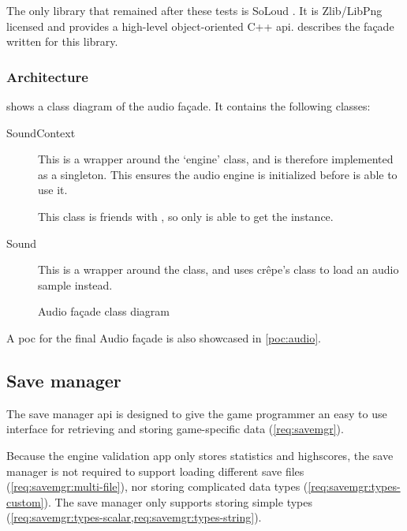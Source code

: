 \documentclass{projdoc}
\begin{document}
The only library that remained after these tests is SoLoud \autocite{lib:soloud}. It
is Zlib/LibPng licensed and provides a high-level object-oriented C++ \gls{api}.
 describes the fa\c{c}ade written for this library.

\subsubsection{Architecture}
\label{sec:audio:architecture}

 shows a class diagram of the audio fa\c{c}ade. It
contains the following classes:
\begin{description}
	\item[SoundContext] This is a wrapper around the 
		`engine' class, and is therefore implemented as a singleton. This ensures the
		audio engine is initialized before  is able to use it.

		This class is friends with , so only  is able
		to get the  instance.
	\item[Sound] This is a wrapper around the  class, and uses
		cr\^epe's  class to load an audio sample instead.
\end{description}

\begin{figure}
	\centering
	\caption{Audio fa\c{c}ade class diagram}
	\label{fig:class-audio-facade}
\end{figure}

A \gls{poc} for the final Audio fa\c{c}ade is also showcased in \cref{poc:audio}.

\subsection{Save manager}

The save manager \gls{api} is designed to give the game programmer an easy to use
interface for retrieving and storing game-specific data (\cref{req:savemgr}).

Because the engine validation app only stores statistics and highscores, the save
manager is not required to support loading different save files
(\cref{req:savemgr:multi-file}), nor storing complicated data types
(\cref{req:savemgr:types-custom}). The save manager only supports storing simple
types (\cref{req:savemgr:types-scalar,req:savemgr:types-string}).
\end{document}

